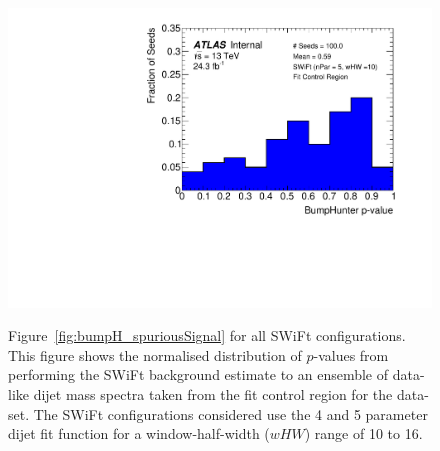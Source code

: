 \begin{figure}[!htb]
 {                                                    
  \includegraphics[width=0.32\linewidth, angle=0]{figs/Dibjet/LowMass/FitStudy_min566/pVal_bumpHunter_corrFitCR_5para_low10_high10.pdf}
}
\caption[Figure~\ref{fig:bumpH_spuriousSignal} for all SWiFt configurations.]
 {\label{fig:app-bumpH_spuriousSignal}
 Figure~\ref{fig:bumpH_spuriousSignal} for all SWiFt configurations.
  This figure shows the normalised distribution of \bh{} $p$-values from performing the SWiFt background estimate to an ensemble of
  data-like dijet mass spectra taken from the fit control region for the \lm{} data-set.
  The SWiFt configurations considered use the 4 and 5 parameter dijet fit function for a window-half-width ($wHW$) range of 10 to 16.
}
\end{figure}


